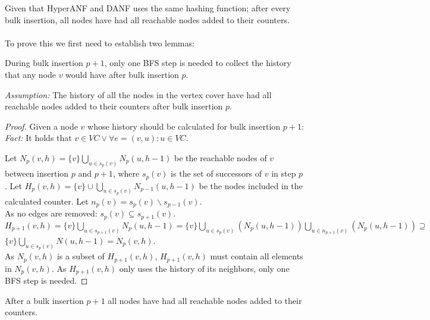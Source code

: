 \begin{theorem} Given that HyperANF and DANF uses the same hashing function; after every bulk insertion, all nodes have had all reachable nodes added to their counters. \\\\
To prove this we first need to establish two lemmas:\\

\begin{lemma} During bulk insertion $p+1$, only one BFS step is needed to collect the history that any node $v$ would have after bulk insertion $p$. \\\label{lemma:partial_history_calculation}

\noindent\textit{Assumption:} The history of all the nodes in the vertex cover have had all reachable nodes added to their counters after bulk insertion $p$.

\begin{proof} Given a node $v$ whose history should be calculated for bulk insertion $p+1$:\\

\noindent\textit{Fact:} It holds that $v \in VC \vee \forall e = (v,u) : u \in VC$.

\noindent Let $N_p(v,h) = \{v\}\bigcup\limits_{u \in s_p(v)} N_p(u,h-1) $ be the reachable nodes of $v$ between insertion $p$ and $p+1$, where $s_p(v)$ is the set of successors of $v$ in step $p$. Let $H_p(v,h) = \{v\}\cup\bigcup\limits_{u\in s_{p}(v)}N_{p-1}(u,h-1)$ be the nodes included in the calculated counter. Let $n_p(v)=s_p(v)\backslash s_{p-1}(v)$.\\


\noindent As no edges are removed: 
$s_p(v) \subseteq s_{p+1}(v)$.\\ 
$H_{p+1}(v,h) = \{v\}\bigcup\limits_{u\in s_{p+1}(v)}N_{p}(u,h-1) = \{v\}\bigcup\limits_{u\in s_{p}(v)}(N_{p}(u,h-1)) \bigcup\limits_{u\in n_{p+1}(v)}(N_{p}(u,h-1)) \supseteq $\\ $\{v\}\bigcup\limits_{u \in s_p(v)} N(u,h-1) = N_p(v,h)$. \\

\noindent As $N_p(v,h)$ is a subset of $H_{p+1}(v,h)$, $H_{p+1}(v,h)$ must contain all elements in $N_p(v,h)$. As $H_{p+1}(v,h)$ only uses the history of its neighbors, only one BFS step is needed. 

\end{proof} 
\end{lemma}

\begin{lemma} After a bulk insertion $p+1$ all nodes have had all reachable nodes added to their counters.\\
\label{lemma:propagation}


\end{lemma}
\end{theorem}
